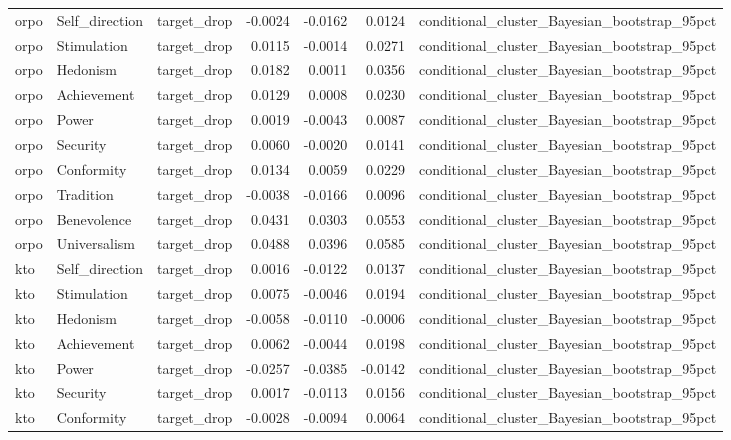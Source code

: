 \begin{tabular}{lllrrrl}
orpo & Self\_direction & target\_drop & -0.0024 & -0.0162 & 0.0124 & conditional\_cluster\_Bayesian\_bootstrap\_95pct \\
orpo & Stimulation & target\_drop & 0.0115 & -0.0014 & 0.0271 & conditional\_cluster\_Bayesian\_bootstrap\_95pct \\
orpo & Hedonism & target\_drop & 0.0182 & 0.0011 & 0.0356 & conditional\_cluster\_Bayesian\_bootstrap\_95pct \\
orpo & Achievement & target\_drop & 0.0129 & 0.0008 & 0.0230 & conditional\_cluster\_Bayesian\_bootstrap\_95pct \\
orpo & Power & target\_drop & 0.0019 & -0.0043 & 0.0087 & conditional\_cluster\_Bayesian\_bootstrap\_95pct \\
orpo & Security & target\_drop & 0.0060 & -0.0020 & 0.0141 & conditional\_cluster\_Bayesian\_bootstrap\_95pct \\
orpo & Conformity & target\_drop & 0.0134 & 0.0059 & 0.0229 & conditional\_cluster\_Bayesian\_bootstrap\_95pct \\
orpo & Tradition & target\_drop & -0.0038 & -0.0166 & 0.0096 & conditional\_cluster\_Bayesian\_bootstrap\_95pct \\
orpo & Benevolence & target\_drop & 0.0431 & 0.0303 & 0.0553 & conditional\_cluster\_Bayesian\_bootstrap\_95pct \\
orpo & Universalism & target\_drop & 0.0488 & 0.0396 & 0.0585 & conditional\_cluster\_Bayesian\_bootstrap\_95pct \\
kto & Self\_direction & target\_drop & 0.0016 & -0.0122 & 0.0137 & conditional\_cluster\_Bayesian\_bootstrap\_95pct \\
kto & Stimulation & target\_drop & 0.0075 & -0.0046 & 0.0194 & conditional\_cluster\_Bayesian\_bootstrap\_95pct \\
kto & Hedonism & target\_drop & -0.0058 & -0.0110 & -0.0006 & conditional\_cluster\_Bayesian\_bootstrap\_95pct \\
kto & Achievement & target\_drop & 0.0062 & -0.0044 & 0.0198 & conditional\_cluster\_Bayesian\_bootstrap\_95pct \\
kto & Power & target\_drop & -0.0257 & -0.0385 & -0.0142 & conditional\_cluster\_Bayesian\_bootstrap\_95pct \\
kto & Security & target\_drop & 0.0017 & -0.0113 & 0.0156 & conditional\_cluster\_Bayesian\_bootstrap\_95pct \\
kto & Conformity & target\_drop & -0.0028 & -0.0094 & 0.0064 & conditional\_cluster\_Bayesian\_bootstrap\_95pct \\

\end{tabular}
